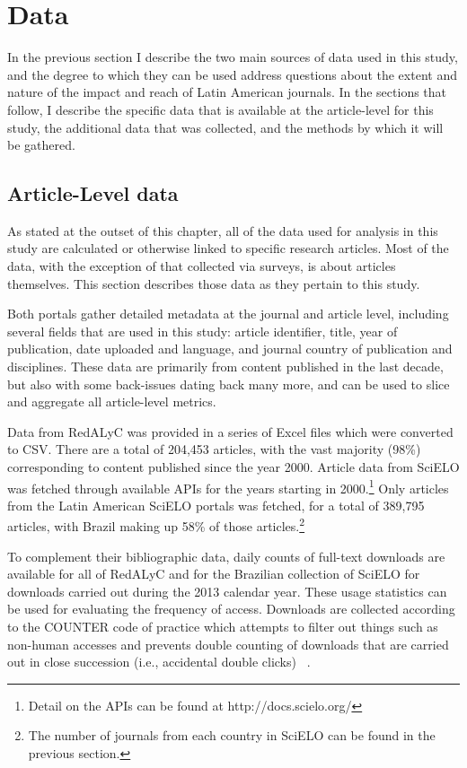 \section{Data}
\label{data}

In the previous section I describe the two main sources of data used in this study, and the degree to which they can be used address questions about the extent and nature of the impact and reach of Latin American journals. In the sections that follow, I describe the specific data that is available at the article-level for this study, the additional data that was collected, and the methods by which it will be gathered.

\subsection{Article-Level data}
\label{article-leveldata}

As stated at the outset of this chapter, all of the data used for analysis in this study are calculated or otherwise linked to specific research articles. Most of the data, with the exception of that collected via surveys, is about articles themselves. This section describes those data as they pertain to this study.

Both portals gather detailed metadata at the journal and article level, including several fields that are used in this study: article identifier, title, year of publication, date uploaded and language, and journal country of publication and disciplines. These data are primarily from content published in the last decade, but also with some back-issues dating back many more, and can be used to slice and aggregate all article-level metrics.

Data from RedALyC was provided in a series of Excel files which were converted to CSV. There are a total of 204,453 articles, with the vast majority (98\%) corresponding to content published since the year 2000. Article data from SciELO was fetched through available APIs for the years starting in 2000.\footnote{Detail on the APIs can be found at http:\slash \slash docs.scielo.org\slash } Only articles from the Latin American SciELO portals was fetched, for a total of 389,795 articles, with Brazil making up 58\% of those articles.\footnote{The number of journals from each country in SciELO can be found in the previous section.}

To complement their bibliographic data, daily counts of full-text downloads are available for all of RedALyC and for the Brazilian collection of SciELO for downloads carried out during the 2013 calendar year. These usage statistics can be used for evaluating the frequency of access. Downloads are collected according to the COUNTER code of practice which attempts to filter out things such as non-human accesses and prevents double counting of downloads that are carried out in close succession (i.e., accidental double clicks) ~\citep{COUNTER2012}.

